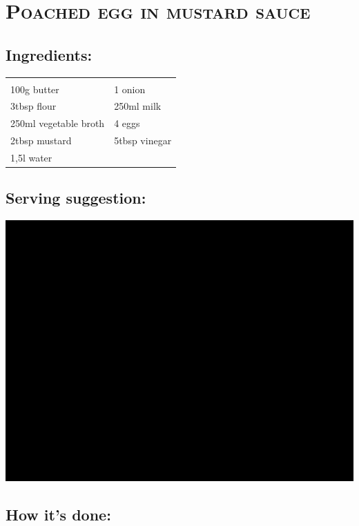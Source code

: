 \section{\textsc{Poached egg in mustard sauce}}

\subsection*{Ingredients:}

\begin{tabular}{p{7.5cm} p{7.5cm}}
	& \\
	100g butter & 1 onion \\
	3tbsp flour & 250ml milk \\
  250ml vegetable broth & 4 eggs \\
  2tbsp mustard & 5tbsp vinegar \\
  1,5l water &
\end{tabular}

\subsection*{Serving suggestion:}

\includegraphics[width=\textwidth]{img/ph.jpg} \cite{eisenfsosse}

\subsection*{How it's done:}

